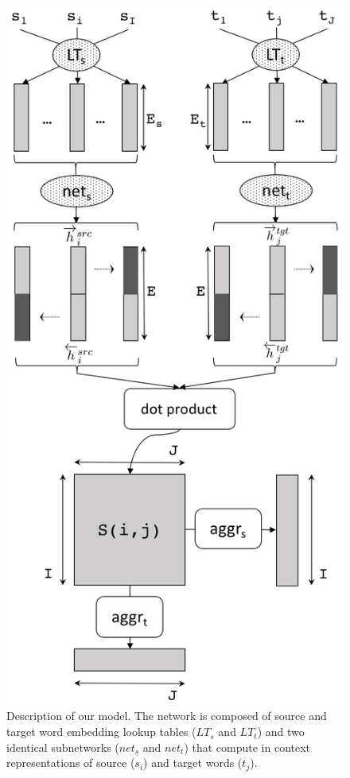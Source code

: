 \documentclass[11pt,a4paper]{article}
\begin{document}
\begin{figure}[h]
\center
    \includegraphics[width=1.0\linewidth]{network}
    \caption{Description of our model. The network is composed of source and target word embedding lookup tables ($LT_s$ and $LT_t$) and two identical subnetworks ($net_s$ and $net_t$) that compute in context representations of source ($s_i$) and target words ($t_j$).} 
    \label{network}
\end{figure}
\end{document}
